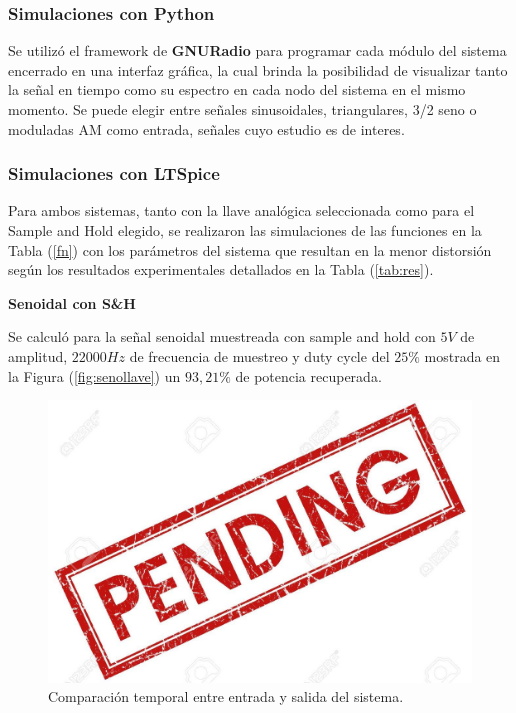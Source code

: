 \subsubsection{Simulaciones con Python}
Se utilizó el framework de \textbf{GNURadio} para programar cada módulo del sistema encerrado en una interfaz gráfica, la cual brinda la posibilidad de visualizar tanto la señal en tiempo como su espectro en cada nodo del sistema en el mismo momento. Se puede elegir entre señales sinusoidales, triangulares, 3/2 seno o moduladas AM como entrada, señales cuyo estudio es de interes.

\subsubsection{Simulaciones con LTSpice}
Para ambos sistemas, tanto con la llave analógica seleccionada como para el Sample and Hold elegido, se realizaron las simulaciones de las funciones en la Tabla (\ref{fn}) con los parámetros del sistema que resultan en la menor distorsión según los resultados experimentales detallados en la Tabla (\ref{tab:res}).

%

\textbf{Senoidal con S\&H}

Se calculó para la señal senoidal muestreada con sample and hold con $5V$ de amplitud, $22000Hz$ de frecuencia de muestreo y duty cycle del $25\%$ mostrada en la Figura (\ref{fig:senollave}) un $93,21\%$ de potencia recuperada. 

\begin{figure}[H]
\centering
\includegraphics[width=\textwidth]{ImagenesEjercicio6/pend.jpg}
\caption{Comparación temporal entre entrada y salida del sistema.}
\end{figure}

